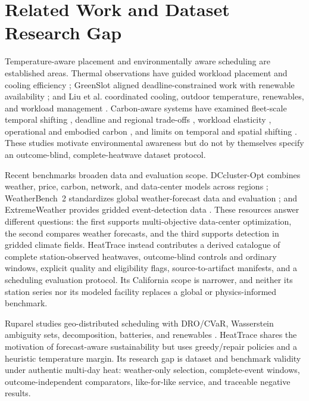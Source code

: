 \documentclass[pdflatex,sn-mathphys-num]{sn-jnl}
\begin{document}
\section{Related Work and Dataset Research Gap}\label{sec:related}

Temperature-aware placement and environmentally aware scheduling are established areas. Thermal observations have guided workload placement and cooling efficiency \cite{moore2005making}; GreenSlot aligned deadline-constrained work with renewable availability \cite{goiri2011greenslot}; and Liu et al. coordinated cooling, outdoor temperature, renewables, and workload management \cite{liu2012renewable}. Carbon-aware systems have examined fleet-scale temporal shifting \cite{radovanovic2023carbon}, deadline and regional trade-offs \cite{wiesner2021let}, workload elasticity \cite{hanafy2023carbonscaler}, operational and embodied carbon \cite{acun2023carbon}, and limits on temporal and spatial shifting \cite{sukprasert2024limitations}. These studies motivate environmental awareness but do not by themselves specify an outcome-blind, complete-heatwave dataset protocol.

Recent benchmarks broaden data and evaluation scope. DCcluster-Opt combines weather, price, carbon, network, and data-center models across regions \cite{guillenperez2025dccluster}; WeatherBench~2 standardizes global weather-forecast data and evaluation \cite{rasp2024weatherbench}; and ExtremeWeather provides gridded event-detection data \cite{racah2017extremeweather}. These resources answer different questions: the first supports multi-objective data-center optimization, the second compares weather forecasts, and the third supports detection in gridded climate fields. HeatTrace instead contributes a derived catalogue of complete station-observed heatwaves, outcome-blind controls and ordinary windows, explicit quality and eligibility flags, source-to-artifact manifests, and a scheduling evaluation protocol. Its California scope is narrower, and neither its station series nor its modeled facility replaces a global or physics-informed benchmark.

Ruparel studies geo-distributed scheduling with DRO/CVaR, Wasserstein ambiguity sets, decomposition, batteries, and renewables \cite{ruparel2026carbon}. HeatTrace shares the motivation of forecast-aware sustainability but uses greedy/repair policies and a heuristic temperature margin. Its research gap is dataset and benchmark validity under authentic multi-day heat: weather-only selection, complete-event windows, outcome-independent comparators, like-for-like service, and traceable negative results.
\end{document}
